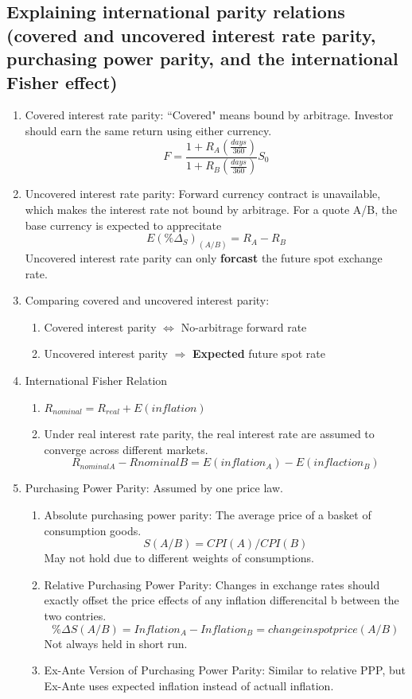 \documentclass{article}
\newcommand{\be}{\begin{enumerate}}
\newcommand{\ee}{\end{enumerate}}
\begin{document}
\subsection{Explaining international parity relations (covered and uncovered 
interest rate parity, purchasing power parity, and the international Fisher effect)}
\be
    \item Covered interest rate parity: ``Covered" means bound by arbitrage. 
        Investor should earn the same return using either currency.
        $$
            F=\frac{1+R_A(\frac{days}{360})}{1+R_B(\frac{days}{360})}S_0
        $$
    \item Uncovered interest rate parity: Forward currency contract is unavailable, 
        which makes the interest rate not bound by arbitrage.
        For a quote A/B, the base currency is expected to apprecitate
        $$
            E(\%\Delta_S)_(A/B)=R_A-R_B
        $$
        Uncovered interest rate parity can only {\bf forcast} the future spot exchange rate.
    \item Comparing covered and uncovered interest parity:
        \be
            \item Covered interest parity $\Leftrightarrow$ No-arbitrage forward rate
            \item Uncovered interest parity $\Rightarrow$ {\bf Expected} future spot rate
        \ee
    \item International Fisher Relation
        \be
            \item $R_{nominal}=R_{real}+E(inflation)$
            \item Under real interest rate parity, the real interest rate are 
                assumed to converge across different markets.
                $$
                    R_{nominal A}-R{nominal B}=E(inflation_A)-E(inflaction_B)
                $$
        \ee
    \item Purchasing Power Parity: Assumed by one price law.
        \be
            \item Absolute purchasing power parity: The average price of a basket
                of consumption goods.
                $$
                    S(A/B)=CPI(A)/CPI(B)
                $$
                May not hold due to different weights of consumptions.
            \item Relative Purchasing Power Parity: Changes in exchange rates 
                should exactly offset the price effects of any inflation differencital b
                between the two contries.
                $$
                \%\Delta S(A/B)=Inflation_A-Inflation_B=change in spot price(A/B)
                $$
                Not always held in short run.
            \item Ex-Ante Version of Purchasing Power Parity: Similar to relative PPP,
                but Ex-Ante uses expected inflation instead of actuall inflation.
        \ee
\ee
\end{document}
